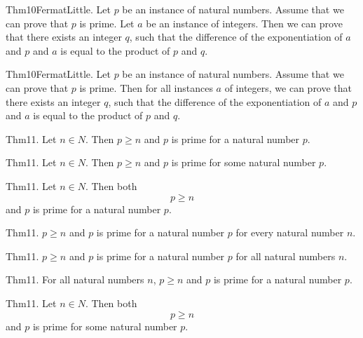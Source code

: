 \documentclass{article}
\begin{document}
Thm10FermatLittle. Let $p$ be an instance of natural numbers. Assume that we can prove that $p$ is prime. Let $a$ be an instance of integers. Then we can prove that there exists an integer $q$, such that the difference of the exponentiation of $a$ and $p$ and $a$ is equal to the product of $p$ and $q$.

Thm10FermatLittle. Let $p$ be an instance of natural numbers. Assume that we can prove that $p$ is prime. Then for all instances $a$ of integers, we can prove that there exists an integer $q$, such that the difference of the exponentiation of $a$ and $p$ and $a$ is equal to the product of $p$ and $q$.

Thm11. Let $n \in N$. Then $p \geq n$ and $p$ is prime for a natural number $p$.

Thm11. Let $n \in N$. Then $p \geq n$ and $p$ is prime for some natural number $p$.

Thm11. Let $n \in N$. Then both $$p \geq n$$ and $p$ is prime for a natural number $p$.

Thm11. $p \geq n$ and $p$ is prime for a natural number $p$ for every natural number $n$.

Thm11. $p \geq n$ and $p$ is prime for a natural number $p$ for all natural numbers $n$.

Thm11. For all natural numbers $n$, $p \geq n$ and $p$ is prime for a natural number $p$.

Thm11. Let $n \in N$. Then both $$p \geq n$$ and $p$ is prime for some natural number $p$.
\end{document}
